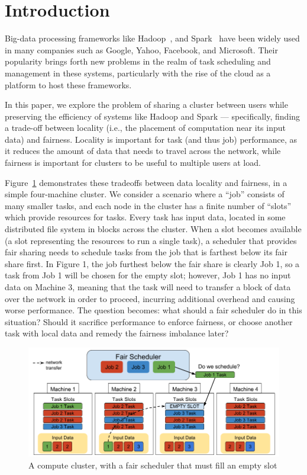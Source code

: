 \section{Introduction}\label{sec:intro}
Big-data processing frameworks like Hadoop~\cite{Shvachko:2010}, and Spark~\cite{Zaharia2012} have been widely 
used in many companies such as Google, Yahoo, Facebook, and Microsoft. Their popularity 
brings forth new problems in the realm of task scheduling and management in these systems,
particularly with the rise of the cloud as a platform to host these frameworks.

In this paper, we explore the problem of sharing a cluster between users while preserving 
the efficiency of systems like Hadoop and Spark --- specifically, finding a trade-off 
between locality (i.e., the placement of computation near its input data) and fairness. 
Locality is important for task (and thus job) performance, as it reduces the amount of data 
that needs to travel across the network, while fairness is important for clusters to be 
useful to multiple users at load. 

Figure~\ref{fig:cluster}  demonstrates these tradeoffs between data locality and fairness,
in a simple four-machine cluster. We consider a
scenario where a ``job'' consists of many smaller tasks, and each node in the cluster 
has a finite number of ``slots'' which provide resources for tasks. Every task has input data,
located in some distributed file system in blocks across the cluster. When a slot
becomes available (a slot representing the resources to run a single task),
a scheduler that provides fair sharing needs to schedule tasks from the job 
that is farthest below its fair share first. In Figure 1, the job furthest below
the fair share is clearly Job 1, so a task from Job 1 will be chosen for the empty slot; however,
Job 1 has no input data on Machine 3, meaning that the task will need to transfer a block
of data over the network in order to proceed, incurring additional overhead and causing
worse performance. The question becomes: what should a fair scheduler do
in this situation? Should it sacrifice performance to enforce fairness, or choose another task
with local data and remedy the fairness imbalance later? 

\begin{figure}[t]
        \includegraphics[width=\linewidth]{./fig1.png}
        \caption{A compute cluster, with a fair scheduler that must fill an empty slot}
        \label{fig:cluster}
    \endminipage
\end{figure}

